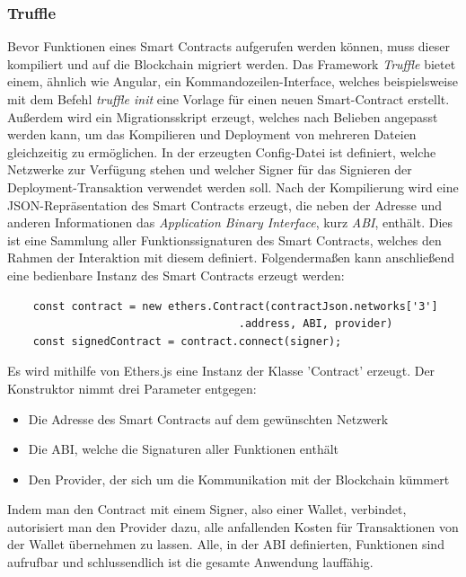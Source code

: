\subsubsection{Truffle}
Bevor Funktionen eines Smart Contracts aufgerufen werden können, muss dieser kompiliert und auf die Blockchain migriert werden. Das Framework \emph{Truffle} bietet einem, ähnlich wie Angular, ein Kommandozeilen-Interface, welches beispielsweise mit dem Befehl \emph{truffle init} eine Vorlage für einen neuen Smart-Contract erstellt. Außerdem wird ein Migrationsskript erzeugt, welches nach Belieben angepasst werden kann, um das Kompilieren und Deployment von mehreren Dateien gleichzeitig zu ermöglichen. In der erzeugten Config-Datei ist definiert, welche Netzwerke zur Verfügung stehen und welcher Signer für das Signieren der Deployment-Transaktion verwendet werden soll. Nach der Kompilierung wird eine JSON-Repräsentation des Smart Contracts erzeugt, die neben der Adresse und anderen Informationen das \emph{Application Binary Interface}, kurz \emph{ABI}, enthält. Dies ist eine Sammlung aller Funktionssignaturen des Smart Contracts, welches den Rahmen der Interaktion mit diesem definiert.
Folgendermaßen kann anschließend eine bedienbare Instanz des Smart Contracts erzeugt werden: 
\begin{lstlisting}
	const contract = new ethers.Contract(contractJson.networks['3']
									.address, ABI, provider)
	const signedContract = contract.connect(signer);
\end{lstlisting}
Es wird mithilfe von Ethers.js eine Instanz der Klasse 'Contract' erzeugt. Der Konstruktor nimmt drei Parameter entgegen:
\begin{itemize}
	\item Die Adresse des Smart Contracts auf dem gewünschten Netzwerk
	\item Die ABI, welche die Signaturen aller Funktionen enthält
	\item Den Provider, der sich um die Kommunikation mit der Blockchain kümmert
\end{itemize}
Indem man den Contract mit einem Signer, also einer Wallet, verbindet, autorisiert man den Provider dazu, alle anfallenden Kosten für Transaktionen von der Wallet übernehmen zu lassen. Alle, in der ABI definierten, Funktionen sind aufrufbar und schlussendlich ist die gesamte Anwendung lauffähig.

